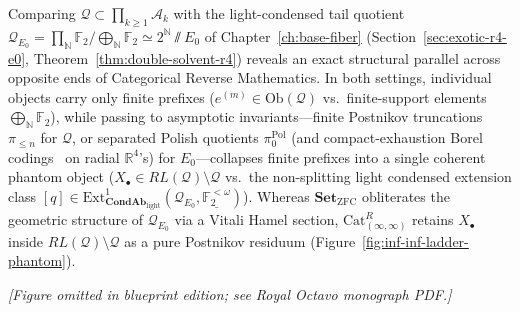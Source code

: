 \begin{remark}\label{rem:step-product-e0-twin}
Comparing $\mathcal{Q} \subset \prod_{k \ge 1} \mathcal{A}_k$ with the light-condensed tail quotient $\mathcal{Q}_{E_0} = \prod_{\mathbb{N}} \mathbb{F}_2 / \bigoplus_{\mathbb{N}} \mathbb{F}_2 \simeq 2^{\mathbb{N}} \sslash E_0$ of Chapter~\ref{ch:base-fiber} (Section~\ref{sec:exotic-r4-e0}, Theorem~\ref{thm:double-solvent-r4}) reveals an exact structural parallel across opposite ends of Categorical Reverse Mathematics. In both settings, individual objects carry only finite prefixes ($e^{(m)} \in \mathrm{Ob}(\mathcal{Q})$ vs.\ finite-support elements $\bigoplus_{\mathbb{N}} \mathbb{F}_2$), while passing to asymptotic invariants---finite Postnikov truncations $\pi_{\le n}$ for $\mathcal{Q}$, or separated Polish quotients $\pi_0^{\mathrm{Pol}}$ (and compact-exhaustion Borel codings~\cite{GompfPanagiotopoulos26} on radial $\mathbb{R}^4$'s) for $E_0$---collapses finite prefixes into a single coherent phantom object ($X_\bullet \in RL(\mathcal{Q}) \setminus \mathcal{Q}$ vs.\ the non-splitting light condensed extension class $[q] \in \mathrm{Ext}^1_{\mathbf{CondAb}_{\mathrm{light}}}(\mathcal{Q}_{E_0}, \underline{\mathbb{F}_2^{<\omega}})$). Whereas $\mathbf{Set}_{\mathrm{ZFC}}$ obliterates the geometric structure of $\mathcal{Q}_{E_0}$ via a Vitali Hamel section, $\mathrm{Cat}^R_{(\infty, \infty)}$ retains $X_\bullet$ inside $RL(\mathcal{Q}) \setminus \mathcal{Q}$ as a pure Postnikov residuum (Figure~\ref{fig:inf-inf-ladder-phantom}).
\end{remark}

\begin{center}\emph{[Figure omitted in blueprint edition; see Royal Octavo monograph PDF.]}\label{fig:inf-inf-ladder-phantom}\end{center}

